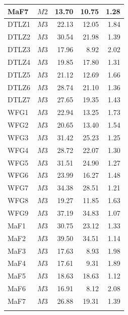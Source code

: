 \begin{table}[t]
\begin{tabular}{llrrr}
MaF7 & $M2$ & 13.70 & 10.75 & 1.28 \\
\midrule
DTLZ1 & $M3$ & 22.13 & 12.05 & 1.84 \\
DTLZ2 & $M3$ & 30.54 & 21.98 & 1.39 \\
DTLZ3 & $M3$ & 17.96 & 8.92 & 2.02 \\
DTLZ4 & $M3$ & 19.85 & 17.80 & 1.31 \\
DTLZ5 & $M3$ & 21.12 & 12.69 & 1.66 \\
DTLZ6 & $M3$ & 28.74 & 21.10 & 1.36 \\
DTLZ7 & $M3$ & 27.65 & 19.35 & 1.43 \\
WFG1 & $M3$ & 22.94 & 13.25 & 1.73 \\
WFG2 & $M3$ & 20.65 & 13.40 & 1.54 \\
WFG3 & $M3$ & 31.42 & 25.23 & 1.25 \\
WFG4 & $M3$ & 28.72 & 22.07 & 1.30 \\
WFG5 & $M3$ & 31.51 & 24.90 & 1.27 \\
WFG6 & $M3$ & 23.99 & 16.27 & 1.48 \\
WFG7 & $M3$ & 34.38 & 28.51 & 1.21 \\
WFG8 & $M3$ & 19.27 & 11.85 & 1.63 \\
WFG9 & $M3$ & 37.19 & 34.83 & 1.07 \\
MaF1 & $M3$ & 30.75 & 23.12 & 1.33 \\
MaF2 & $M3$ & 39.50 & 34.51 & 1.14 \\
MaF3 & $M3$ & 17.63 & 8.93 & 1.98 \\
MaF4 & $M3$ & 17.61 & 9.31 & 1.89 \\
MaF5 & $M3$ & 18.63 & 18.63 & 1.12 \\
MaF6 & $M3$ & 16.91 & 8.12 & 2.08 \\
MaF7 & $M3$ & 26.88 & 19.31 & 1.39 \\
\botrule
\end{tabular}
\end{table}